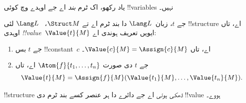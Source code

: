 \documentclass[../../../include/open-logic-section]{subfiles}
\begin{document}


\begin{explain}
یاد رکھو، اک ٹرم \emph{بند} اے جے اوہدے وچ کوئی !!{variable}s نہیں۔
\end{explain}

\begin{defn}
جے $t$، زبان~$\Lang L$ دا بند ٹرم اے تے $\Struct M$،
~$\Lang L$ لئی !!{structure} اے، تاں اوہدی
\emph{!!{value}}~$\Value{t}{M}$ ایویں تعریف ہوندی اے:
\begin{enumerate}
\item جے $t$ بس !!{constant}~$c$ اے، تاں $\Value{c}{M} = \Assign{c}{M}$۔
\item جے $t$ دی صورت $\Atom{f}{t_1, \ldots, t_n}$ اے، تاں
  \[
  \Value{t}{M} = \Assign{f}{M}(\Value{t_1}{M}, \ldots,
  \Value{t_n}{M}).
  \]
\end{enumerate}
\end{defn}

\begin{defn}
!!{structure} \emph{ڈھکی ہوئی} اے جے دائرے دا ہر عنصر
کسے بند ٹرم دی !!{value} ہووے۔
\end{defn}
\end{document}
